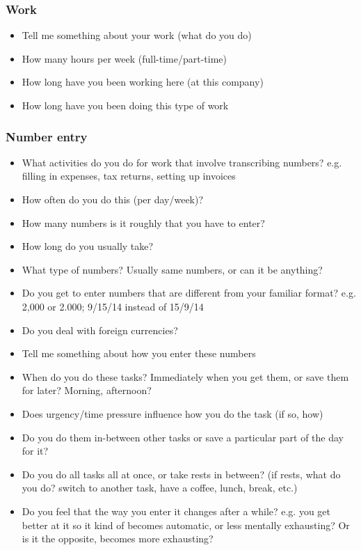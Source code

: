 \documentclass[11pt,oneside]{report}
\begin{document}
\begin{table}
\subsubsection{Work}
\begin{itemize}
\item Tell me something about your work (what do you do)
\item  How many hours per week (full-time/part-time)
\item How long have you been working here (at this company) \item How long have you been doing this type of work
\end{itemize}
\subsubsection{Number entry}
\begin{itemize}
\item  What activities do you do for work that involve transcribing numbers?
e.g. filling in expenses, tax returns, setting up invoices
\item How often do you do this (per day/week)?
\item How many numbers is it roughly that you have to enter?
\item How long do you usually take?
\item What type of numbers? Usually same numbers, or can it be anything?
\item Do you get to enter numbers that are different from your familiar format?
e.g. 2,000 or 2.000; 9/15/14 instead of 15/9/14
\item Do you deal with foreign currencies?
\item Tell me something about how you enter these numbers
\item When do you do these tasks? Immediately when you get them, or save them for later? Morning, afternoon?
\item Does urgency/time pressure influence how you do the task (if so, how)
\item Do you do them in-between other tasks or save a particular part of the day for it?
\item Do you do all tasks all at once, or take rests in between?
(if rests, what do you do? switch to another task, have a coffee, lunch, break, etc.)
\item Do you feel that the way you enter it changes after a while?
e.g. you get better at it so it kind of becomes automatic, or less mentally exhausting? Or is it the opposite, becomes more exhausting?

\end{itemize}
\end{table}
\end{document}
